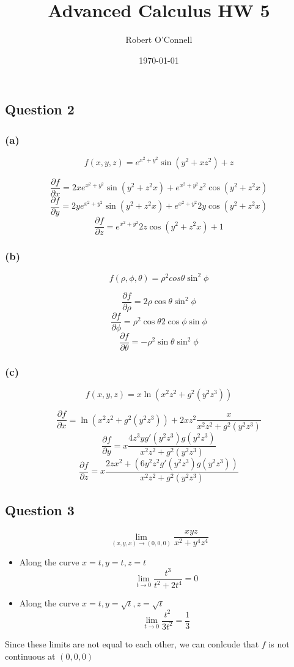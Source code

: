 \documentclass{article}
\title{\textbf{Advanced Calculus HW 5}}
\author{Robert O'Connell}
\date{\today}
\begin{document}
\vspace{10mm}

\subsection*{Question 2}
\subsubsection*{(a)}
\[
f(x,y,z) = e^{x^2 + y^2} \sin(y^2 + xz^2) + z
\]

\[
\frac{\partial f}{\partial x} = 2x e^{x^2 + y^2} \sin(y^2 + z^2 x) + e^{x^2 + y^2} z^2 \cos(y^2 + z^2 x)
\]
\[
\frac{\partial f}{\partial y} = 2y e^{x^2 + y^2} \sin(y^2 + z^2 x) + e^{x^2 + y^2} 2y \cos(y^2 + z^2x)
\]
\[
\frac{\partial f}{\partial z} = e^{x^2 + y^2} 2z \cos(y^2 + z^2 x) + 1
\]

\subsubsection*{(b)}
\[
f(\rho, \phi, \theta) = \rho^2 cos \theta \sin^2 \phi
\]

\[
\frac{\partial f }{\partial \rho} = 2 \rho \cos \theta \sin^2 \phi 
\]
\[
\frac{\partial f}{\partial \phi} = \rho^2 \cos \theta 2 \cos \phi \sin \phi
\]
\[
\frac{\partial f}{\partial \theta} =  - \rho^2 \sin \theta \sin^2 \phi
\]

\subsubsection*{(c)}
\[
f(x,y,z) = x \ln(x^2z^2 + g^2(y^2z^3))
\]

\[
\frac{\partial f}{\partial x} = \ln(x^2z^2 + g^2(y^2z^3)) + 2xz^2 \frac{x}{x^2z^2 + g^2(y^2z^3)}
\]
\[
\frac{\partial f}{\partial y} = x \frac{4z^3y g'(y^2z^3) g(y^2z^3)}{x^2z^2 + g^2(y^2z^3)}
\]
\[
\frac{\partial f}{\partial z} = x \frac{2zx^2 + (6 y^2 z^2 g'(y^2z^3) g(y^2z^3))}{x^2z^2 + g^2(y^2z^3)}
\]

\subsection*{Question 3}
\[
\lim_{(x,y,x)\to(0,0,0)}{\frac{xyz}{x^2 + y^4 z^4}}
\]

\begin{itemize}
    \item Along the curve \(x = t, y = t, z = t\)
    \[
    \lim_{t\to 0}{\frac{t^3}{t^2 + 2t^4}} = 0
    \]
    \item Along the curve \(x = t, y = \sqrt{t}, z = \sqrt{t}\)
    \[
    \lim_{t\to 0}{\frac{t^2}{3t^2}} = \frac{1}{3}
    \]
\end{itemize}
Since these limits are not equal to each other, we can conlcude that \(f\) is not 
continuous at \((0,0,0)\)
\end{document}
